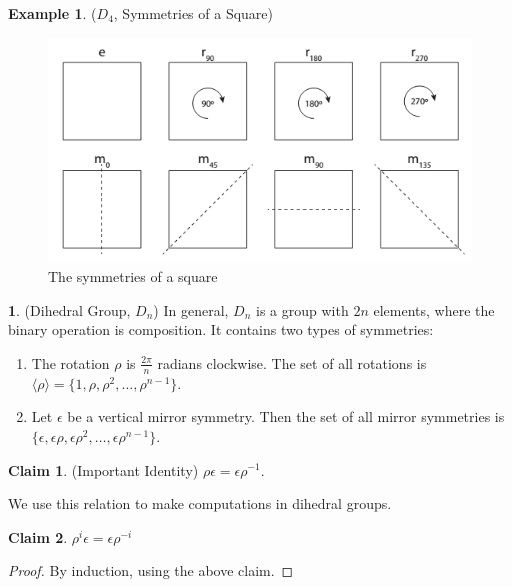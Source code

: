 \documentclass[12pt]{article}
\theoremstyle{definition}
\newtheorem{definition}{\color{NavyBlue}{\textbf{Definition}}}
\newcommand{\e}{\epsilon}
\newtheorem{claim}{\color{JungleGreen}Claim}
\newtheorem{example}{\color{WildStrawberry}Example}
\theoremstyle{definition}
\begin{document}
\begin{example}($D_4$, Symmetries of a Square)
\begin{figure}[H]
	\begin{center}
		\includegraphics[scale=.75]{square-symmetries}
	\end{center}
	\caption{The symmetries of a square}
	\label{triangle_sym}
\end{figure}

\end{example}

\begin{definition}(Dihedral Group, $D_n$)
In general, $D_n$ is a group with $2n$ elements, where the binary operation is composition. It contains two types of symmetries:
\begin{enumerate}
	\item The rotation $\rho$ is $\frac{2\pi}{n}$ radians clockwise. The set of all rotations is $\langle \rho \rangle = \{1, \rho, \rho^2, \ldots, \rho^{n-1} \}$. 
	\item Let $\e$ be a vertical mirror symmetry. Then the set of all mirror symmetries is $\{\e, \e\rho, \e\rho^2, \ldots, \e \rho^{n-1} \}$. 
\end{enumerate}
\end{definition}


\begin{claim}(Important Identity)
$\rho \e = \e \rho^{-1}$. 
\end{claim}
We use this relation to make computations in dihedral groups. 


\begin{claim}
$\rho^i \e = \e \rho^{-i}$
\end{claim}
\begin{proof}
By induction, using the above claim. 
\end{proof}
\end{document}
